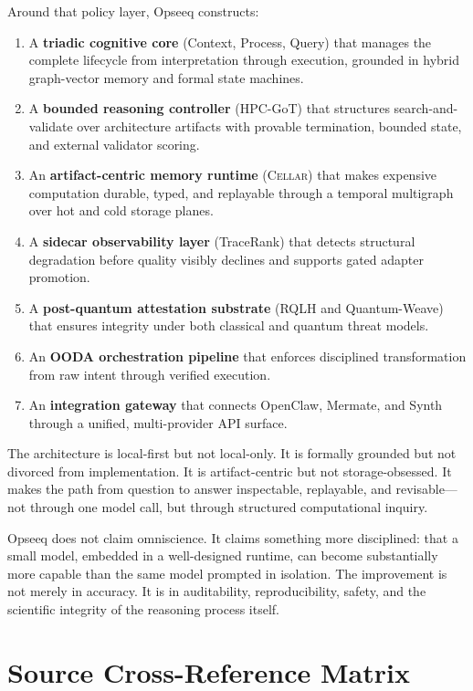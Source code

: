 \documentclass[11pt]{article}
\theoremstyle{remark}
\newcommand{\cellar}{\textsc{Cellar}}
\begin{document}
Around that policy layer, Opseeq constructs:

\begin{enumerate}
  \item A \textbf{triadic cognitive core} (Context, Process, Query) that manages the complete lifecycle from interpretation through execution, grounded in hybrid graph-vector memory and formal state machines.
  \item A \textbf{bounded reasoning controller} (HPC-GoT) that structures search-and-validate over architecture artifacts with provable termination, bounded state, and external validator scoring.
  \item An \textbf{artifact-centric memory runtime} (\cellar{}) that makes expensive computation durable, typed, and replayable through a temporal multigraph over hot and cold storage planes.
  \item A \textbf{sidecar observability layer} (TraceRank) that detects structural degradation before quality visibly declines and supports gated adapter promotion.
  \item A \textbf{post-quantum attestation substrate} (RQLH and Quantum-Weave) that ensures integrity under both classical and quantum threat models.
  \item An \textbf{OODA orchestration pipeline} that enforces disciplined transformation from raw intent through verified execution.
  \item An \textbf{integration gateway} that connects OpenClaw, Mermate, and Synth through a unified, multi-provider API surface.
\end{enumerate}

The architecture is local-first but not local-only. It is formally grounded but not divorced from implementation. It is artifact-centric but not storage-obsessed. It makes the path from question to answer inspectable, replayable, and revisable---not through one model call, but through structured computational inquiry.

Opseeq does not claim omniscience. It claims something more disciplined: that a small model, embedded in a well-designed runtime, can become substantially more capable than the same model prompted in isolation. The improvement is not merely in accuracy. It is in auditability, reproducibility, safety, and the scientific integrity of the reasoning process itself.

\appendix

\section{Source Cross-Reference Matrix}
\label{app:crossref}
\end{document}
